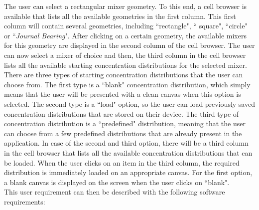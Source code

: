 The user can select a rectangular mixer geometry. To this end, a cell browser is available that lists all the available geometries in the first column. This first column will contain several geometries, including ``rectangle", `` square", ``circle" or ``\emph{Journal Bearing}". After clicking on a certain geometry, the available mixers for this geometry are displayed in the second column of the cell browser. The user can now select a mixer of choice and then, the third column in the cell browser lists all the available starting concentration distributions for the selected mixer. There are three types of starting concentration distributions that the user can choose from. The first type is a ``blank" concentration distribution, which simply means that the user will be presented with a clean canvas when this option is selected. The second type is a ``load" option, so the user can load previously saved concentration distributions that are stored on their device. The third type of concentration distribution is a ``predefined" distribution, meaning that the user can choose from a few predefined distributions that are already present in the application. In case of the second and third option, there will be a third column in the cell browser that lists all the available concentration distributions that can be loaded. When the user clicks on an item in the third column, the required distribution is immediately loaded on an appropriate canvas. For the first option, a blank canvas is displayed on the screen when the user clicks on ``blank". \\
This user requirement can then be described with the following software requirements:

